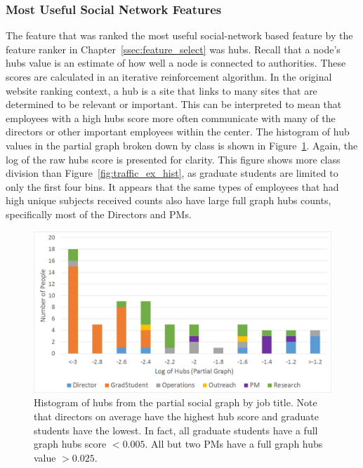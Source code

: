 \documentclass[12pt]{report}
\begin{document}
\subsubsection{Most Useful Social Network Features}
The feature that was ranked the most useful social-network based feature by the feature ranker in Chapter~\ref{ssec:feature_select} was hubs.
Recall that a node's hubs value is an estimate of how well a node is connected to authorities.
These scores are calculated in an iterative reinforcement algorithm.
In the original website ranking context, a hub is a site that links to many sites that are determined to be relevant or important.
This can be interpreted to mean that employees with a high hubs score more often communicate with many of the directors or other important employees within the center.
The histogram of hub values in the partial graph broken down by class is shown in Figure~\ref{fig:social_ex_hist}.
Again, the log of the raw hubs score is presented for clarity.
This figure shows more class division than Figure~\ref{fig:traffic_ex_hist}, as graduate students are limited to only the first four bins.
It appears that the same types of employees that had high unique subjects received counts also have large full graph hubs counts, specifically most of the Directors and PMs.

\begin{figure}[t]
    \centering
        \includegraphics[width=\columnwidth,trim={2mm 3mm 2mm 3mm},clip]{Hubs_hist}
        \vspace{-17pt}
        \caption[Histogram of the hubs feature for the partial graph]{Histogram of hubs from the partial social graph by job title.  Note that directors on average have the highest hub score and graduate students have the lowest.  In fact, all graduate students have a full graph hubs score $<0.005$.  All but two PMs have a full graph hubs value $>0.025$.}
        \label{fig:social_ex_hist}
\end{figure}
\end{document}

